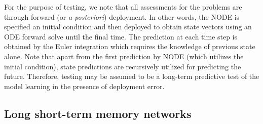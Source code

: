 \documentclass[preprint,12pt]{elsarticle}
\begin{document}
For the purpose of testing, we note that all assessments for the problems are through forward (or \emph{a posteriori}) deployment. In other words, the NODE is specified an initial condition and then deployed to obtain state vectors using an ODE forward solve until the final time. The prediction at each time step is obtained by the Euler integration which requires the knowledge of previous state alone. Note that apart from the first prediction by NODE (which utilizes the initial condition), state predictions are recursively utilized for predicting the future. Therefore, testing may be assumed to be a long-term predictive test of the model learning in the presence of deployment error.


\subsection{Long short-term memory networks}
\end{document}
